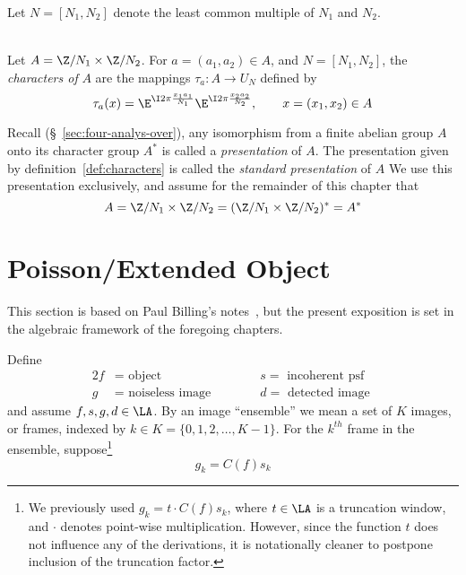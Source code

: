 Let $N = [N_1,N_2]$ denote the least common multiple of $N_1$ and $N_2$.
\begin{definition}[Characters of $A$]\\ %
\label{def:characters}
Let $A = \Z/N_1\times \Z/N_2$.
For $a  = (a_1, a_2) \in A$, %
and $N = [N_1,N_2]$, the \emph{characters of} 
$A$ %
are the mappings 
$\tau_a: A \to U_N$ %
defined by
\[
\tau_a(x) = \E^{\I 2\pi \frac{x_1a_1}{N_1}}\E^{\I 2\pi \frac{x_2a_2}{N_2}}, \qquad
x  = (x_1, x_2) \in 
A %
\]
\end{definition}

Recall (\S\ \ref{sec:four-analys-over}), any isomorphism from a finite abelian
group $A$ onto its character group $A^*$ is called a \emph{presentation} of
$A$.  The presentation given by definition~\ref{def:characters} is called the 
\emph{standard presentation} of 
$A$ %
We use this presentation exclusively, and assume for the remainder of this
chapter that 
\[
A = \Z/N_1 \times \Z/N_2 = (\Z/N_1 \times \Z/N_2)^* = A^*
\]

   \newcommand\groupA{\ensuremath{A}}
   \newcommand\groupK{\ensuremath{K}}
   \newcommand\groupJ{\ensuremath{J}}
\section{Poisson/Extended Object}\label{sec:poiss-object}
\author{Paul Billings and William DeMeo}
This section is based on Paul Billing's notes~\cite{Billings:2001}, but the
present exposition is set in the algebraic framework of the foregoing chapters.

Define
\begin{alignat*}{2}
f &= \text{ object } \qquad  &&s= \text{ incoherent psf }\\
g &= \text{ noiseless image } \qquad  &&d = \text{ detected image }
\end{alignat*}
and assume $f, s, g, d \in \LA$.
By an image ``ensemble'' we mean a set of $K$ images, or frames,
indexed by 
$k \in \groupK = \{0, 1,2, \ldots,K-1\}$.
For the $k^{th}$ frame in the ensemble, suppose\footnote{We previously used $g_k =t\cdot C(f)s_k$,
where $t\in \LA$ is a truncation window, and $\cdot$ denotes point-wise
multiplication. 
However, since the function $t$ does not
influence any of the derivations, it is notationally cleaner to postpone
inclusion of the truncation factor.}
\begin{equation}\label{eq:g}
g_k = C(f)s_k %
\end{equation}

